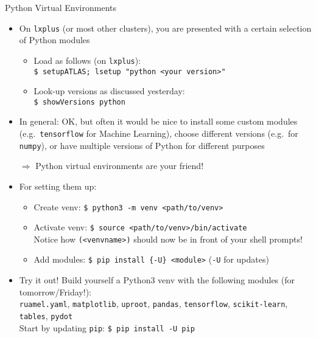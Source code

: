 \documentclass[10pt, aspectratio=169]{beamer}
\begin{document}
\begin{frame}{Python Virtual Environments}
  \begin{itemize}
  \item
    On \texttt{lxplus} (or most other clusters), you are presented with a certain selection of Python modules
    \begin{itemize}
    \item
      Load as follows (on \texttt{lxplus}): \\
      \quad \texttt{\$ setupATLAS; lsetup "python <your version>"}
    \item
      Look-up versions as discussed yesterday: \\
      \quad \texttt{\$ showVersions python}
    \end{itemize}
  \item
    In general: OK, but often it would be nice to install some custom modules (e.g.\ \texttt{tensorflow} for Machine Learning), choose different versions (e.g.\ for \texttt{numpy}), or have multiple versions of Python for different purposes
  \item[$\Rightarrow$]
    Python virtual environments are your friend!
  \item
    For setting them up:
    \begin{itemize}
    \item
      Create venv: \texttt{\$ python{3} -m venv <path/to/venv>}
    \item
      Activate venv: \texttt{\$ source <path/to/venv>/bin/activate} \\
      Notice how \texttt{(<venvname>)} should now be in front of your shell prompts!
    \item
      Add modules: \texttt{\$ pip install \{-U\} <module>} (\texttt{-U} for updates)
    \end{itemize}
  \item
    Try it out! Build yourself a Python3 venv with the following modules (for tomorrow/Friday!): \\
    \texttt{ruamel.yaml}, \texttt{matplotlib}, \texttt{uproot}, \texttt{pandas}, \texttt{tensorflow}, \texttt{scikit-learn}, \texttt{tables}, \texttt{pydot} \\
     Start by updating \texttt{pip}: \texttt{\$ pip install -U pip}
  \end{itemize}
\end{frame}
\end{document}
